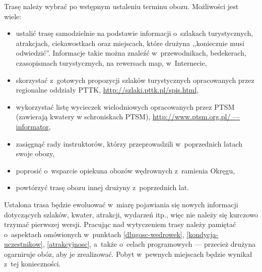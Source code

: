 \documentclass[a5paper,10pt,titlepage,twoside]{article}
\begin{document}
Trasę należy wybrać po wstępnym ustaleniu terminu obozu. Możliwości jest wiele:
\begin{itemize}
\item ustalić trasę samodzielnie na podstawie informacji o~szlakach turystycznych, atrakcjach, ciekawostkach oraz miejscach, które drużyna ,,koniecznie musi odwiedzić''. Informacje takie można znaleźć w~przewodnikach, bedekerach, czasopismach turystycznych, na rewersach map, w~Internecie,
\item skorzystać z~gotowych propozycji szlaków turystycznych opracowanych przez regionalne oddziały PTTK, \href{http://szlaki.pttk.pl/spis.html}{http://szlaki.pttk.pl/spis.html},
\item wykorzystać listę wycieczek wielodniowych opracowanych przez PTSM (zawierają kwatery w schroniskach PTSM), \href{http://www.ptsm.org.pl/}{http://www.ptsm.org.pl/ --- informator},
\item zasięgnąć rady instruktorów, którzy przeprowadzili w~poprzednich latach swoje obozy,
\item poprosić o~wsparcie opiekuna obozów wędrownych z~ramienia Okręgu,
\item powtórzyć trasę obozu innej drużyny z~poprzednich lat.
\end{itemize}
Ustalona trasa będzie ewoluować w~miarę pojawiania się nowych informacji dotyczących szlaków, kwater, atrakcji, wydarzeń itp., więc nie należy się kurczowo trzymać pierwszej wersji. Pracując nad wytyczeniem trasy należy pamiętać o~aspektach omówionych w~punktach \ref{dlugosc-wedrowek}, \ref{kondycja-uczestnikow}, \ref{atrakcyjnosc}, a~także o~celach programowych --- przecież drużyna ogarniruje obóz, aby je zrealizować. Pobyt w~pewnych miejscach będzie wynikał z~tej konieczności.
\end{document}
